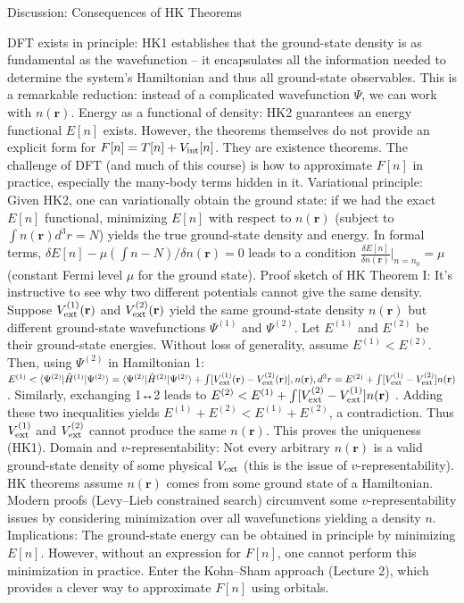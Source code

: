 \begin{frame}{Discussion: Consequences of HK Theorems}

DFT exists in principle: HK1 establishes that the ground-state density is as fundamental as the wavefunction – it encapsulates all the information needed to determine the system’s Hamiltonian and thus all ground-state observables. This is a remarkable reduction: instead of a complicated wavefunction $\Psi$, we can work with $n(\mathbf{r})$.
Energy as a functional of density: HK2 guarantees an energy functional $E[n]$ exists. However, the theorems themselves do not provide an explicit form for $F[n] = T[n] + V_{\rm int}[n]$. They are existence theorems. The challenge of DFT (and much of this course) is how to approximate $F[n]$ in practice, especially the many-body terms hidden in it.
Variational principle: Given HK2, one can variationally obtain the ground state: if we had the exact $E[n]$ functional, minimizing $E[n]$ with respect to $n(\mathbf{r})$ (subject to $\int n(\mathbf{r}) d^3r = N$) yields the true ground-state density and energy. In formal terms, $\delta {E[n] - \mu(\int n - N)} / \delta n(\mathbf{r}) = 0$ leads to a condition $\frac{\delta E[n]}{\delta n(\mathbf{r})}\big|_{n=n_0} = \mu$ (constant Fermi level $\mu$ for the ground state).
Proof sketch of HK Theorem I: It’s instructive to see why two different potentials cannot give the same density. Suppose $V_{\rm ext}^{(1)}(\mathbf{r})$ and $V_{\rm ext}^{(2)}(\mathbf{r})$ yield the same ground-state density $n(\mathbf{r})$ but different ground-state wavefunctions $\Psi^{(1)}$ and $\Psi^{(2)}$. Let $E^{(1)}$ and $E^{(2)}$ be their ground-state energies. Without loss of generality, assume $E^{(1)} < E^{(2)}$. Then, using $\Psi^{(2)}$ in Hamiltonian 1: $E^{(1)} < \langle \Psi^{(2)}|\hat{H}^{(1)}|\Psi^{(2)}\rangle = \langle \Psi^{(2)}|\hat{H}^{(2)}|\Psi^{(2)}\rangle + \int [V_{\rm ext}^{(1)}(\mathbf{r})-V_{\rm ext}^{(2)}(\mathbf{r})],n(\mathbf{r}),d^3r = E^{(2)} + \int [V_{\rm ext}^{(1)}-V_{\rm ext}^{(2)}] n(\mathbf{r})$ . Similarly, exchanging 1↔2 leads to $E^{(2)} < E^{(1)} + \int [V_{\rm ext}^{(2)}-V_{\rm ext}^{(1)}] n(\mathbf{r})$ . Adding these two inequalities yields $E^{(1)} + E^{(2)} < E^{(1)} + E^{(2)}$, a contradiction. Thus $V_{\rm ext}^{(1)}$ and $V_{\rm ext}^{(2)}$ cannot produce the same $n(\mathbf{r})$. This proves the uniqueness (HK1).
Domain and $v$-representability: Not every arbitrary $n(\mathbf{r})$ is a valid ground-state density of some physical $V_{\rm ext}$ (this is the issue of $v$-representability). HK theorems assume $n(\mathbf{r})$ comes from some ground state of a Hamiltonian. Modern proofs (Levy–Lieb constrained search) circumvent some $v$-representability issues by considering minimization over all wavefunctions yielding a density $n$.
Implications: The ground-state energy can be obtained in principle by minimizing $E[n]$. However, without an expression for $F[n]$, one cannot perform this minimization in practice. Enter the Kohn–Sham approach (Lecture 2), which provides a clever way to approximate $F[n]$ using orbitals. \end{frame}


